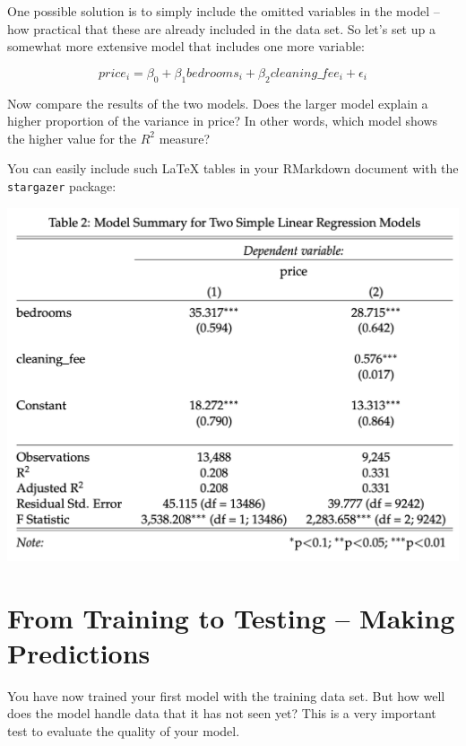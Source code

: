 \documentclass[
  11pt,
]{book}
\newenvironment{tips}[1]
  {
  \begin{itemize}
  \footnotesize
  \renewcommand{\labelitemi}{
    \raisebox{-.7\height}[0pt][0pt]{
      {\setkeys{Gin}{width=3em,keepaspectratio}
        \texttt{[image: images/\#1.png]}}
    }
  }
  \setlength{\fboxsep}{1em}
  \begin{rbox}
  \item
  }
  {
  \end{rbox}
  \end{itemize}
  }
\begin{document}
One possible solution is to simply include the omitted variables in the model -- how practical that these are already included in the data set. So let's set up a somewhat more extensive model that includes one more variable:

\[price_i = \beta_0 + \beta_1 bedrooms_i + \beta_2 cleaning\_fee_i + \epsilon_i\]

Now compare the results of the two models. Does the larger model explain a higher proportion of the variance in price? In other words, which model shows the higher value for the \(R^2\) measure?

\begin{tips}r

You can easily include such LaTeX tables in your RMarkdown document with the \texttt{stargazer} package:

\begin{center}\includegraphics[width=1\linewidth]{plot/5_table} \end{center}

\end{tips}

\hypertarget{from-training-to-testing-making-predictions}{%
\section{From Training to Testing -- Making Predictions}\label{from-training-to-testing-making-predictions}}

You have now trained your first model with the training data set. But how well does the model handle data that it has not seen yet? This is a very important test to evaluate the quality of your model.
\end{document}
